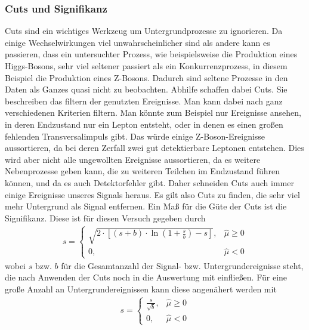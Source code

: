 \subsubsection{Cuts und Signifikanz}
Cuts sind ein wichtiges Werkzeug um Untergrundprozesse zu ignorieren.
Da einige Wechselwirkungen viel unwahrscheinlicher sind als andere kann es passieren, dass ein untersuchter Prozess, wie beispielsweise die Produktion eines Higgs-Bosons, sehr viel seltener passiert als ein Konkurrenzprozess, in diesem Beispiel die Produktion eines Z-Bosons.
Dadurch sind seltene Prozesse in den Daten als Ganzes quasi nicht zu beobachten.
Abhilfe schaffen dabei Cuts.
Sie beschreiben das filtern der genutzten Ereignisse.
Man kann dabei nach ganz verschiedenen Kriterien filtern.
Man könnte zum Beispiel nur Ereignisse ansehen, in deren Endzustand nur ein Lepton entsteht, oder in denen es einen großen fehlenden Transversalimpuls gibt.
Das würde einige Z-Boson-Ereignisse aussortieren, da bei deren Zerfall zwei gut detektierbare Leptonen entstehen.
Dies wird aber nicht alle ungewollten Ereignisse aussortieren, da es weitere Nebenprozesse geben kann, die zu weiteren Teilchen im Endzustand führen können, und da es auch Detektorfehler gibt.
Daher schneiden Cuts auch immer einige Ereignisse unseres Signals heraus.
Es gilt also Cuts zu finden, die sehr viel mehr Untergrund als Signal entfernen.
Ein Maß für die Güte der Cuts ist die Signifikanz.
Diese ist für diesen Versuch gegeben durch
\begin{gather}
s =
\begin{cases}
\sqrt{2 \cdot [(s+b) \cdot \ln{(1+\frac{s}{b})} - s]}, & \hat{\mu} \geq 0 \\
0, & \hat{\mu} < 0
\end{cases}
\end{gather}
wobei $s$ bzw. $b$ für die Gesamtanzahl der Signal- bzw. Untergrundereignisse steht, die nach Anwenden der Cuts noch in die Auswertung mit einfließen.
Für eine große Anzahl an Untergrundereignissen kann diese angenähert werden mit
\begin{gather}
s =
\begin{cases}
\frac{s}{\sqrt{b}}, & \hat{\mu} \geq 0 \\
0, & \hat{\mu} < 0
\end{cases}
\end{gather}


